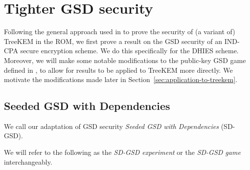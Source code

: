 \chapter{Tighter GSD security}


Following the general approach used in \cite{ttkem} to prove the security of (a variant of) TreeKEM in the ROM, we first prove a result on the GSD security of an IND-CPA secure encryption scheme. We do this specifically for the DHIES scheme. Moreover, we will make some notable modifications to the public-key GSD game defined in \cite{ttkem}, to allow for results to be applied to TreeKEM more directly. We motivate the modifications made later in Section~\vref{sec:application-to-treekem}.

\section{Seeded GSD with Dependencies}

We call our adaptation of GSD security \emph{Seeded GSD with Dependencies} (SD-GSD).


We will refer to the following as the \emph{SD-GSD experiment} or the \emph{SD-GSD game} interchangeably.


